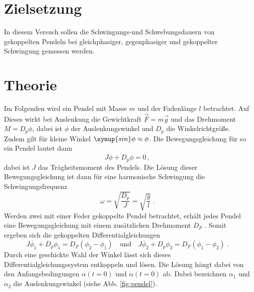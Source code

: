 \section{Zielsetzung}
In diesem Versuch sollen die Schwingungs-und Schwebungsdauern von
gekoppelten Pendeln bei gleichphasiger, gegenphasiger und gekoppelter
Schwingung gemessen werden.
\section{Theorie}
\label{sec:Theorie}
Im Folgenden wird ein Pendel mit Masse $m$ und der Fadenlänge $l$
betrachtet. Auf Dieses wirkt bei Auslenkung die Gewichtkraft $\vec{F} = m\vec{g}$
und das Drehmoment $ M = D_p \phi $, dabei ist $\phi$ der Auslenkungswinkel
und $D_p$ die Winkelrichtgröße. Zudem gilt für kleine Winkel $\symup{sin}\phi
\approx \phi$. Die Bewegungsgleichung für so ein Pendel lautet dann
\begin{equation*}
  J \ddot{\phi} + D_p \phi = 0\, ,
\end{equation*}
dabei ist $J$ das Trägheitsmoment des Pendels. Die Lösung dieser Bewegungsgleichung
ist dann für eine harmonische Schwingung die Schwingungsfrequenz
\begin{equation}
  \omega = \sqrt{\frac{D_p}{J}} = \sqrt{\frac{g}{l}}\;.
  \label{eqn:l1}
\end{equation}
Werden zwei mit einer Feder gekoppelte Pendel betrachtet,
erhält jedes Pendel eine Bewegungsgleichung
mit einem zusätzlichen Drehmoment $D_F$ . Somit ergeben sich die gekoppelten
Differentialgleichungen
\begin{equation*}
J \ddot{\phi_1} + D_p \phi_1 = D_F( \phi_2 - \phi_1) \quad \text{und} \quad
J \ddot{\phi_2} + D_p \phi_2 = D_F( \phi_1 - \phi_2)\;.
\end{equation*}
Durch eine geschickte Wahl der Winkel lässt sich dieses
Differentialgleichungssystem entkoppeln und lösen. Die Lösung hängt dabei von
den Anfangsbedingungen $\alpha(t=0)$ und $\dot{\alpha}(t=0)$ ab. Dabei bezeichnen
$\alpha_1$ und $\alpha_2$ die Auslenkungswinkel (siehe Abb. \ref{fig:pendel}).

